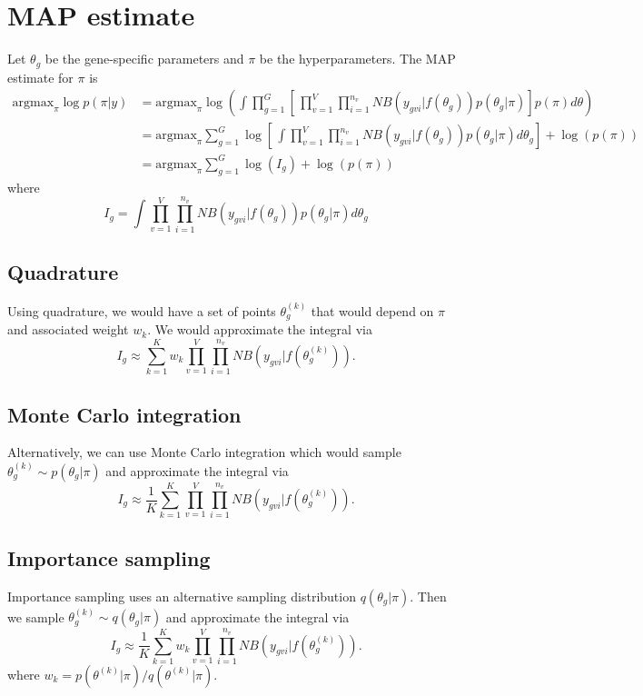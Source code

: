 \documentclass{article}
\newcommand{\argmax}{\mbox{argmax}}
\begin{document}
\section{MAP estimate}

Let $\theta_g$ be the gene-specific parameters and $\pi$ be the hyperparameters. The MAP estimate for $\pi$ is 
\begin{align*}
\argmax_{\pi} \log p(\pi|y) 
&= \argmax_{\pi} \log\left( \int \prod_{g=1}^G \left[ \, \prod_{v=1}^V \prod_{i=1}^{n_v} NB(y_{gvi}|f(\theta_g)) p(\theta_g|\pi) \right] p(\pi) d\theta \right) \\
&= \argmax_{\pi}\sum_{g=1}^G \log \left[ \, \int \prod_{v=1}^V \prod_{i=1}^{n_v} NB(y_{gvi}| f(\theta_g)) p(\theta_g|\pi) d\theta_g  \right] + \log(p(\pi)) \\
&= \argmax_{\pi}\sum_{g=1}^G \log(I_g) + \log(p(\pi)) 
\end{align*}
where 
 \[
 I_g = \int \prod_{v=1}^V \prod_{i=1}^{n_v} NB(y_{gvi}| f(\theta_g)) p(\theta_g|\pi) d\theta_g
 \]

\subsection{Quadrature}

Using quadrature, we would have a set of points $\theta_g^{(k)}$ that would depend on $\pi$ and associated weight $w_k$. We would approximate the integral via 
\[
I_g \approx \sum_{k=1}^K w_k \prod_{v=1}^V \prod_{i=1}^{n_v}  NB(y_{gvi}| f(\theta_g^{(k)})).
\]

\subsection{Monte Carlo integration}

Alternatively, we can use Monte Carlo integration which would sample $\theta_g^{(k)} \sim p(\theta_g|\pi)$ and approximate the integral via 
\[
I_g \approx \frac{1}{K} \sum_{k=1}^K \prod_{v=1}^V \prod_{i=1}^{n_v}  NB(y_{gvi}| f(\theta_g^{(k)})).
\]


\subsection{Importance sampling}

Importance sampling uses an alternative sampling distribution $q(\theta_g|\pi)$. Then we sample $\theta_g^{(k)} \sim q(\theta_g|\pi)$ and approximate the integral via 
\[
I_g \approx \frac{1}{K} \sum_{k=1}^K w_k \prod_{v=1}^V \prod_{i=1}^{n_v} NB(y_{gvi}| f(\theta_g^{(k)})).
\]
where $w_k = p(\theta^{(k)}|\pi)/q(\theta^{(k)}|\pi)$. 
\end{document}
